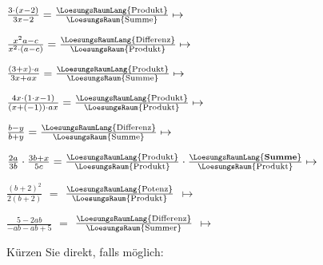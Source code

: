 \begin{bbwAufgabenBlock}




\item  $\frac{3\cdot{}(x-2)}{3x-2}
= \frac{\LoesungsRaumLang{\textrm{Produkt}}}{\LoesungsRaum{\textrm{Summe}}} \mapsto
$ 

\item  $\frac{x^2a-c}{x^2\cdot{}(a-c)} = \frac{\LoesungsRaumLang{\textrm{Differenz}}}{\LoesungsRaum{\textrm{Produkt}}} \mapsto $ 

\item  $\frac{(3+x)\cdot{}a}{3x+ax} = \frac{\LoesungsRaumLang{\textrm{Produkt}}}{\LoesungsRaum{\textrm{Summe}}} \mapsto $ 

\item $\frac{4x\cdot{}(1\cdot{}x-1)}{(x+(-1))\cdot{}ax} = \frac{\LoesungsRaumLang{\textrm{Produkt}}}{\LoesungsRaum{\textrm{Produkt}}} \mapsto $ 

\item  $\frac{b-y}{b+y} = \frac{\LoesungsRaumLang{\textrm{Differenz}}}{\LoesungsRaum{\textrm{Summe}}} \mapsto $ 

\item  $\frac{2a}{3b}\cdot{}\frac{3b+x}{5c}
= \frac{\LoesungsRaumLang{\textrm{Produkt}}}{\LoesungsRaum{\textrm{Produkt}}} \cdot{} \frac{\LoesungsRaumLang{\textrm{\textbf{Summe}}}}{\LoesungsRaum{\textrm{Produkt}}}  \mapsto $ 

\item  $\frac{(b+2)^2}{2(b+2)}$ $=$ $\frac{\LoesungsRaumLang{\textrm{Potenz}}}{\LoesungsRaum{\textrm{Produkt}}}$
$\mapsto$  


\item  $\frac{5-2ab}{-ab-ab+5}$ $=$ $\frac{\LoesungsRaumLang{\textrm{Differenz}}}{\LoesungsRaum{\textrm{Summer}}}$
$\mapsto$ 

\end{bbwAufgabenBlock}


\platzFuerBerechnungenBisEndeSeite{}
\TRAINER{\newpage}

Kürzen Sie direkt, falls möglich:

